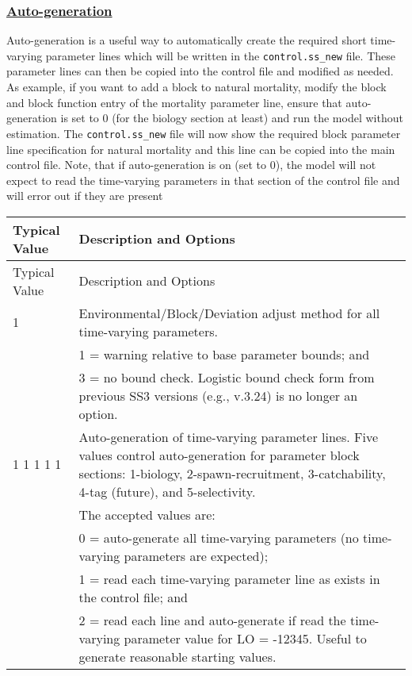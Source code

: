\hypertarget{autogen}{}
\subsubsection[Auto-generation]{\protect\hyperlink{autogen}{Auto-generation}}
Auto-generation is a useful way to automatically create the required short time-varying parameter lines which will be written in the \texttt{control.ss\_new} file. These parameter lines can then be copied into the control file and modified as needed. As example, if you want to add a block to natural mortality, modify the block and block function entry of the mortality parameter line, ensure that auto-generation is set to 0 (for the biology section at least) and run the model without estimation. The \texttt{control.ss\_new} file will now show the required block parameter line specification for natural mortality and this line can be copied into the main control file. Note, that if auto-generation is on (set to 0), the model will not expect to read the time-varying parameters in that section of the control file and will error out if they are present

	
\begin{longtable}{p{0.5cm} p{2cm} p{12.5cm}}
	\hline
	\multicolumn{2}{l}{Typical Value} & Description and Options \Tstrut\Bstrut\\
	\hline
	\endfirsthead

	\hline
	\multicolumn{2}{l}{Typical Value} & Description and Options \Tstrut\Bstrut\\
	\hline
	\endhead

	\hline
	\endfoot

	\endlastfoot

	1 & & Environmental/Block/Deviation adjust method for all time-varying parameters. \Tstrut\\
	  & & 1 = warning relative to base parameter bounds; and \\
	  & & 3 = no bound check. Logistic bound check form from previous SS3 versions (e.g., v.3.24) is no longer an option. \Bstrut\\

	\multicolumn{2}{l}{1 1 1 1 1} & Auto-generation of time-varying parameter lines. Five values control auto-generation for parameter block sections: 1-biology, 2-spawn-recruitment, 3-catchability, 4-tag (future), and 5-selectivity. \\
	& 			& The accepted values are: \\
	& 			& 0 = auto-generate all time-varying parameters (no time-varying parameters are expected); \\
	& 			& 1 = read each time-varying parameter line as exists in the control file; and \\
	&			& 2 = read each line and auto-generate if read the time-varying parameter value for LO = -12345. Useful to generate reasonable starting values. \Bstrut\\
	\hline
\end{longtable}

